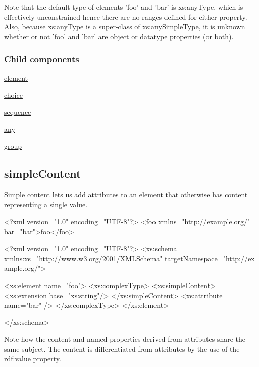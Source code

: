 Note that the default type of elements 'foo' and 'bar' is xs:anyType, which is effectively unconstrained hence there are no ranges defined for either property. Also, because xs:anyType is a super-\/class of xs:anySimpleType, it is unknown whether or not 'foo' and 'bar' are object or datatype properties (or both).\hypertarget{sequence_sequenceChildren}{}\subsubsection{Child components}\label{sequence_sequenceChildren}

\begin{DoxyItemize}
\item \hyperlink{element}{element}
\item \hyperlink{choice}{choice}
\item \hyperlink{sequence}{sequence}
\item \hyperlink{any}{any}
\item \hyperlink{group}{group} 
\end{DoxyItemize}\hypertarget{simpleContent}{}\subsection{simpleContent}\label{simpleContent}
Simple content lets us add attributes to an element that otherwise has content representing a single value.


\begin{DoxyCodeInclude}
<?xml version="1.0" encoding="UTF-8"?>
<foo xmlns="http://example.org/" bar="bar">foo</foo>

\end{DoxyCodeInclude}
 
\begin{DoxyCodeInclude}
<?xml version="1.0" encoding="UTF-8"?>
<xs:schema xmlns:xs="http://www.w3.org/2001/XMLSchema" targetNamespace="http://ex
      ample.org/">
        
        <xs:element name="foo">
                <xs:complexType>
                        <xs:simpleContent>
                                <xs:extension base="xs:string"/>
                        </xs:simpleContent>
                        <xs:attribute name="bar" />
                </xs:complexType>
        </xs:element>

</xs:schema>
\end{DoxyCodeInclude}


Note how the content and named properties derived from attributes share the same subject. The content is differentiated from attributes by the use of the rdf:value property.


